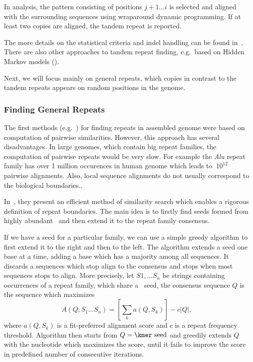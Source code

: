 In analysis, the pattern consisting of positions $j+1\dots i$ is selected and aligned with the surrounding sequences using wraparound dynamic programming\cite{fischetti1992apostolico, myers1989approximate}. If at least two copies are aligned, the tandem repeat is reported.

The more details on the statistical criteria and indel handling can be found in~\cite{trf}. There are also other approaches to tandem repeat finding, e.g.\ based on Hidden Markov models (\cite{tantan, nanasi2014probabilistic}).

Next, we will focus mainly on general repeats, which copies in contrast to the tandem repeats appears on random positions in the genome.

\subsubsection{Finding General Repeats}

The first methods (e.g.~\cite{reputer, repeatfinder, recon, repeatgluer, piler}) for finding repeats in assembled genome were based on computation of pairwise similarities. However, this approach has several disadvantages. In large genomes, which contain big repeat families, the computation of pairwise repeats would be very slow. For example the \textit{Alu} repeat family has over 1 million occurences in human genome which leads to $~10^{12}$ pairwise alignments.
Also, local sequence alignments do not usually correspond to the biological boundaries.\cite{recon}.

In~\cite{repscout}, they present an efficient method of similarity search which enables a rigorous definition of repeat boundaries. The main idea is to firstly find seeds formed from highly abundant \kmers\ and then extend it to the repeat family consensus.

If we have a seed for a particular family, we can use a simple greedy algorithm to first extend it to the right and then to the left. The algorithm extends a seed one base at a time, adding a base which has a majority among all sequences. It discards a sequences which stop align to the consensus and stops when most sequences stops to align. More precisely, let $S1,\dots S_n$ be strings containing occurrences of a repeat family, which share a \kmer\ seed, the consensus sequence $Q$ is the sequence which maximizes
$$A(Q; S_1 \dots S_n) = \left[\sum_k a(Q, S_k)\right] - c |Q|,$$
where $a(Q, S_k)$ is a fit-preferred\cite{repscout} alignment score and $c$ is a repeat frequency threshold.
Algorithm then starts from $Q = \text{\kmer\ seed}$ and greedily extends $Q$ with the nucleotide which maximizes the score, until it fails to improve the score in predefined number of consecutive iterations.

